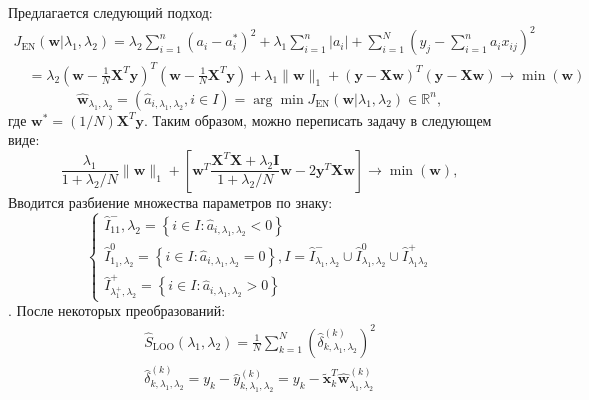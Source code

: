 \documentclass[12pt, twoside]{article}
\newcommand{\wm}{{\mathbf{w}}}
\begin{document}
Предлагается следующий подход:
\begin{equation}
\begin{array}{l}{J_{\mathrm{EN}}\left(\wm | \lambda_{1}, \lambda_{2}\right)=\lambda_{2} \sum_{i=1}^{n}\left(a_{i}-a_{i}^{*}\right)^{2}+\lambda_{1} \sum_{i=1}^{n}\left|a_{i}\right|+\sum_{i=1}^{N}\left(y_{j}-\sum_{i=1}^{n} a_{i} x_{i j}\right)^{2}} \\ {\quad=\lambda_{2}\left(\wm-\frac{1}{N} \mathbf{X}^{T} \mathbf{y}\right)^{T}\left(\wm-\frac{1}{N} \mathbf{X}^{T} \mathbf{y}\right)+\lambda_{1}\|\wm\|_{1}+(\mathbf{y}-\mathbf{X} \wm)^{T}(\mathbf{y}-\mathbf{X} \wm) \rightarrow \min (\wm)}\end{array}
\end{equation}
\begin{equation}
\hat{\wm}_{\lambda_{1}, \lambda_{2}}=\left(\hat{a}_{i, \lambda_{1}, \lambda_{2}}, i \in I\right)=\arg \min J_{\mathrm{EN}}\left(\wm | \lambda_{1}, \lambda_{2}\right) \in \mathbb{R}^{n},
\end{equation}
где $\wm^{*}=(1 / N) \mathbf{X}^{T} \mathbf{y}$. Таким образом, можно переписать задачу в следующем виде:
\begin{equation}
\frac{\lambda_{1}}{1+\lambda_{2} / N}\|\wm\|_{1}+\left[\wm^{T} \frac{\mathbf{X}^{T} \mathbf{X}+\lambda_{2} \mathbf{I}}{1+\lambda_{2} / N} \wm-2 \mathbf{y}^{T} \mathbf{X} \wm\right] \rightarrow \min (\wm),
\end{equation}
Вводится разбиение множества параметров по знаку:
\begin{equation}
\left\{\begin{array}{l}
{\hat{I}_{11}^{-}, \lambda_{2}=\left\{i \in I: \hat{a}_{i, \lambda_{1}, \lambda_{2}}<0\right\}} \\
{\hat{I}_{1_{1}, \lambda_{2}}^{0}=\left\{i \in I: \hat{a}_{i, \lambda_{1}, \lambda_{2}}=0\right\}, I=\hat{I}_{\lambda_{1}, \lambda_{2}}^{-} \cup \hat{I}_{\lambda_{1}, \lambda_{2}}^{0} \cup \hat{I}_{\lambda_{1} \lambda_{2}}^{+}} \\
{\hat{I}_{\lambda_{1}^{+}, \lambda_{2}}^{+}=\left\{i \in I: \hat{a}_{i, \lambda_{1}, \lambda_{2}}>0\right\}}
\end{array}\right.
\end{equation}.
После некоторых преобразований:
\begin{equation}
\begin{array}{c}
{\hat{S}_{\mathrm{LOO}}\left(\lambda_{1}, \lambda_{2}\right)=\frac{1}{N} \sum_{k=1}^{N}\left(\hat{\delta}_{k, \lambda_{1}, \lambda_{2}}^{(k)}\right)^{2}} \\
{\hat{\delta}_{k, \lambda_{1}, \lambda_{2}}^{(k)}=y_{k}-\hat{y}_{k, \lambda_{1}, \lambda_{2}}^{(k)}=y_{k}-\tilde{\mathbf{x}}_{k}^{T} \hat{\wm}_{\lambda_{1}, \lambda_{2}}^{(k)}}
\end{array}
\end{equation}
\end{document}
